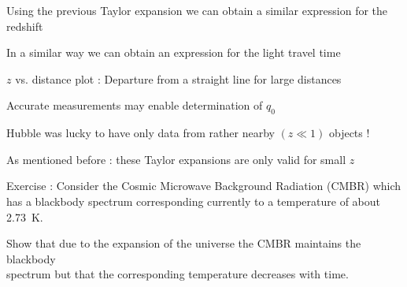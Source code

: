 \Tr
\begin{itemize}
\item Using the previous Taylor expansion we can obtain a similar expression for the redshift
\item[] \begin{center}
        {\red {}}
        \end{center}
\item In a similar way we can obtain an expression for the {\blue light travel time}
\item[] \begin{center}
        {\red {}}
        \end{center}
\item[$\ast$] $z$ vs. distance plot : Departure from a straight line for large distances
\item[] Accurate measurements may enable determination of $q_{0}$
\item[] Hubble was lucky to have only data from rather nearby $(z \ll 1)$ objects ! 
\item As mentioned before : these Taylor expansions are only valid for small $z$
{\red
\item[$\ast$] Exercise : Consider the Cosmic Microwave Background Radiation (CMBR) which has a
              blackbody spectrum corresponding currently to a temperature of about 2.73~K.
\item Show that due to the expansion of the universe the CMBR maintains the blackbody\\
      spectrum but that the corresponding temperature decreases with time.
}
\end{itemize}